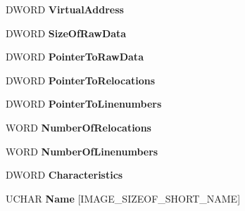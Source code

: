 \begin{DoxyCompactItemize}
\begin{tabbing}
\end{tabbing}\item 
\mbox{\label{struct___i_m_a_g_e___s_e_c_t_i_o_n___h_e_a_d_e_r_ab0f0e24d6b0a17680e8609a608a0d530}} 
D\+W\+O\+RD {\bfseries Virtual\+Address}
\item 
\mbox{\label{struct___i_m_a_g_e___s_e_c_t_i_o_n___h_e_a_d_e_r_a376d19b94bc4c71dc887ec7067e60025}} 
D\+W\+O\+RD {\bfseries Size\+Of\+Raw\+Data}
\item 
\mbox{\label{struct___i_m_a_g_e___s_e_c_t_i_o_n___h_e_a_d_e_r_a7581621fab8f326e12f31a5577896a71}} 
D\+W\+O\+RD {\bfseries Pointer\+To\+Raw\+Data}
\item 
\mbox{\label{struct___i_m_a_g_e___s_e_c_t_i_o_n___h_e_a_d_e_r_a6d59f7e4cff74f3951a7da37454b9084}} 
D\+W\+O\+RD {\bfseries Pointer\+To\+Relocations}
\item 
\mbox{\label{struct___i_m_a_g_e___s_e_c_t_i_o_n___h_e_a_d_e_r_a38bf032a66c8906adca8cb45e4e049b5}} 
D\+W\+O\+RD {\bfseries Pointer\+To\+Linenumbers}
\item 
\mbox{\label{struct___i_m_a_g_e___s_e_c_t_i_o_n___h_e_a_d_e_r_ab49e4f9170d85a8cd78ab0acf2fcef2a}} 
W\+O\+RD {\bfseries Number\+Of\+Relocations}
\item 
\mbox{\label{struct___i_m_a_g_e___s_e_c_t_i_o_n___h_e_a_d_e_r_aace0e3a76840601729527faff6c55f49}} 
W\+O\+RD {\bfseries Number\+Of\+Linenumbers}
\item 
\mbox{\label{struct___i_m_a_g_e___s_e_c_t_i_o_n___h_e_a_d_e_r_a5f031b627355f5c2c5412c522280656b}} 
D\+W\+O\+RD {\bfseries Characteristics}
\item 
\mbox{\label{struct___i_m_a_g_e___s_e_c_t_i_o_n___h_e_a_d_e_r_a4a19b3e695235df51668ebedd0d6bbfa}} 
U\+C\+H\+AR {\bfseries Name} \mbox{[}I\+M\+A\+G\+E\+\_\+\+S\+I\+Z\+E\+O\+F\+\_\+\+S\+H\+O\+R\+T\+\_\+\+N\+A\+ME\mbox{]}

\end{DoxyCompactItemize}
